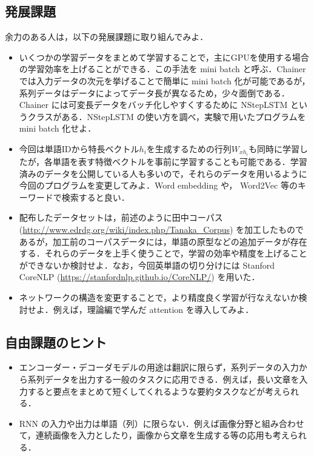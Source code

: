   \subsection{発展課題}
余力のある人は，以下の発展課題に取り組んでみよ．
\begin{itemize}
\item いくつかの学習データをまとめて学習することで，主にGPUを使用する場合の学習効率を上げることができる．この手法を mini batch と呼ぶ．Chainer では入力データの次元を挙げることで簡単に mini batch 化が可能であるが，系列データはデータによってデータ長が異なるため，少々面倒である．Chainer には可変長データをバッチ化しやすくするために NStepLSTM というクラスがある．NStepLSTM の使い方を調べ，実験で用いたプログラムを mini batch 化せよ．
\item 今回は単語IDから特長ベクトル$h_i$を生成するための行列$W_{xh_i}$も同時に学習したが，各単語を表す特徴ベクトルを事前に学習することも可能である．学習済みのデータを公開している人も多いので，それらのデータを用いるように今回のプログラムを変更してみよ．Word embedding や， Word2Vec 等のキーワードで検索すると良い．
\item 配布したデータセットは，前述のように田中コーパス (\url{http://www.edrdg.org/wiki/index.php/Tanaka_Corpus}) を加工したものであるが，加工前のコーパスデータには，単語の原型などの追加データが存在する．それらのデータを上手く使うことで，学習の効率や精度を上げることができないか検討せよ．なお，今回英単語の切り分けには Stanford CoreNLP (\url{https://stanfordnlp.github.io/CoreNLP/}) を用いた．
\item ネットワークの構造を変更することで，より精度良く学習が行なえないか検討せよ．例えば，理論編で学んだ attention を導入してみよ．
\end{itemize}

  \subsection{自由課題のヒント}
\begin{itemize}
\item エンコーダー・デコーダモデルの用途は翻訳に限らず，系列データの入力から系列データを出力する一般のタスクに応用できる．例えば，長い文章を入力すると要点をまとめて短くしてくれるような要約タスクなどが考えられる．
\item RNN の入力や出力は単語（列）に限らない．例えば画像分野と組み合わせて，連続画像を入力としたり，画像から文章を生成する等の応用も考えられる．
\end{itemize}
